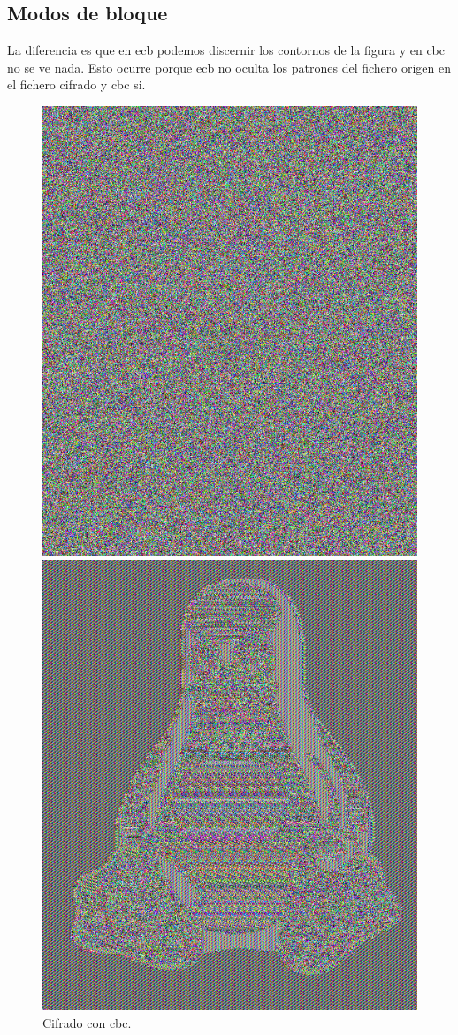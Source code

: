 \documentclass[11pt]{article}
\begin{document}
    \subsection{Modos de bloque}
      \par
      La diferencia es que en ecb podemos discernir los contornos de la figura y en cbc no se ve nada. Esto ocurre porque ecb no oculta los patrones del fichero origen en el fichero cifrado y cbc si.
      \begin{figure}[!h]
        \begin{minipage}[c]{.5\textwidth}
          \centering
          \includegraphics[width = .8\textwidth]{tux-cbc}
          \caption{Cifrado con cbc.}
        \end{minipage}%
        \begin{minipage}[c]{.5\textwidth}
          \centering
          \includegraphics[width = .8\textwidth]{tux-ecb}

\end{minipage}
\end{figure}
\end{document}
